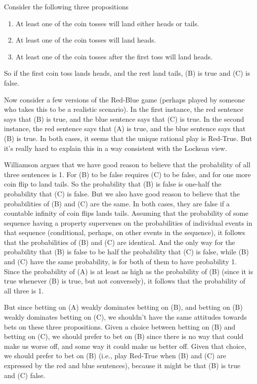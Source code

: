 \documentclass[11pt,]{book}
\providecommand{\tightlist}{%
  \setlength{\itemsep}{0pt}\setlength{\parskip}{0pt}}
\begin{document}
Consider the following three propositions

\begin{enumerate}
\def\labelenumi{(\Alph{enumi})}
\tightlist
\item
  At least one of the coin tosses will land either heads or tails.
\item
  At least one of the coin tosses will land heads.
\item
  At least one of the coin tosses after the first toss will land heads.
\end{enumerate}

So if the first coin toss lands heads, and the rest land tails, (B) is true and (C) is false.

Now consider a few versions of the Red-Blue game (perhaps played by someone who takes this to be a realistic scenario). In the first instance, the red sentence says that (B) is true, and the blue sentence says that (C) is true. In the second instance, the red sentence says that (A) is true, and the blue sentence says that (B) is true. In both cases, it seems that the unique rational play is Red-True. But it's really hard to explain this in a way consistent with the Lockean view.

Williamson argues that we have good reason to believe that the probability of all three sentences is 1. For (B) to be false requires (C) to be false, and for one more coin flip to land tails. So the probability that (B) is false is one-half the probability that (C) is false. But we also have good reason to believe that the probabilities of (B) and (C) are the same. In both cases, they are false if a countable infinity of coin flips lands tails. Assuming that the probability of some sequence having a property supervenes on the probabilities of individual events in that sequence (conditional, perhaps, on other events in the sequence), it follows that the probabilities of (B) and (C) are identical. And the only way for the probability that (B) is false to be half the probability that (C) is false, while (B) and (C) have the same probability, is for both of them to have probability 1. Since the probability of (A) is at least as high as the probability of (B) (since it is true whenever (B) is true, but not conversely), it follows that the probability of all three is 1.

But since betting on (A) weakly dominates betting on (B), and betting on (B) weakly dominates betting on (C), we shouldn't have the same attitudes towards bets on these three propositions. Given a choice between betting on (B) and betting on (C), we should prefer to bet on (B) since there is no way that could make us worse off, and some way it could make us better off. Given that choice, we should prefer to bet on (B) (i.e., play Red-True when (B) and (C) are expressed by the red and blue sentences), because it might be that (B) is true and (C) false.
\end{document}
